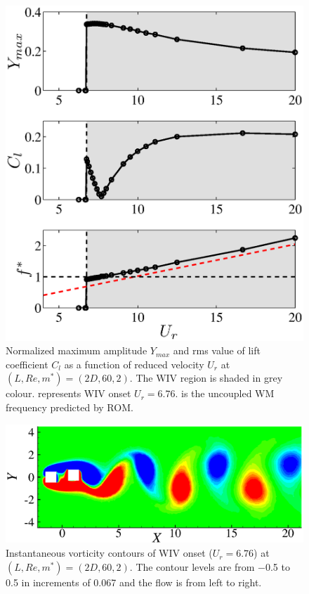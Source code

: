 \begin{figure}
	 \centering
	 \includegraphics[scale=0.45]{fom_square_m2}
     \caption{Normalized maximum amplitude $Y_{max}$ and 
        rms value of lift coefficient $C_l$
         as a function of reduced velocity $U_r$ at $(L,Re,m^*)=(2D,60,2)$. 
        The WIV region is shaded in grey colour.
        {\protect\blackdash} represents WIV onset $U_r=6.76$. {\protect\reddash} is the uncoupled WM frequency predicted by ROM. }
\label{fig:fom_2_ycl}
\end{figure}
\begin{figure}
	 \centering
	 \includegraphics[scale=0.45]{square_re60_m2_onset_vor}
     \caption{Instantaneous vorticity contours of WIV onset ($U_r=6.76$)
      at $(L,Re,m^*)=(2D,60,2)$.
      The contour levels are from −0.5 to 0.5 in increments of 0.067 and the flow is from left to
      right. }
\label{fig:fom_20_onset_vor}
\end{figure}


